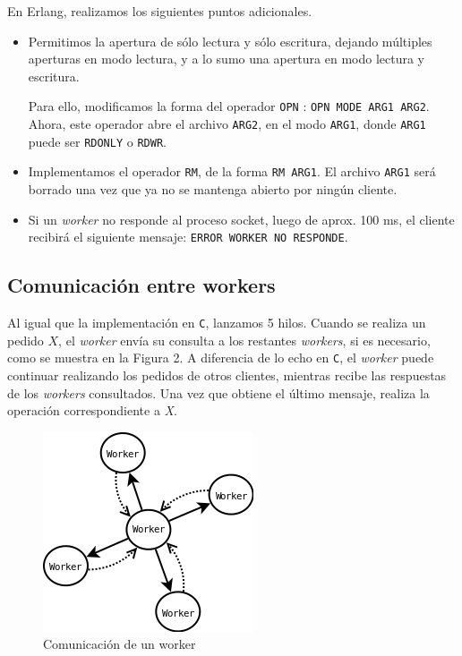 \documentclass[a4paper, 8pt]{article}
\begin{document}
En Erlang, realizamos los siguientes puntos adicionales.

\begin{itemize}
  \item Permitimos la apertura de sólo lectura y sólo escritura, dejando múltiples aperturas en modo lectura, y a lo sumo
  una apertura en modo lectura y escritura.
  
  Para ello, modificamos la forma del operador \texttt{OPN} :
  \texttt{OPN MODE ARG1 ARG2}. Ahora, este operador abre el archivo \texttt{ARG2}, en el modo \texttt{ARG1},
  donde \texttt{ARG1} puede ser \texttt{RDONLY} o \texttt{RDWR}.
  
  \item Implementamos el operador \texttt{RM}, de la forma
  \texttt{RM ARG1}. El archivo \texttt{ARG1} será borrado una vez que ya no se mantenga abierto por ningún cliente.
  
  \item Si un \textit{worker} no responde al proceso socket, luego de aprox. 100 ms, el cliente recibirá el siguiente mensaje: \texttt{ERROR WORKER NO RESPONDE}.
 
\end{itemize}

  \subsection{Comunicación entre workers}
  Al igual que la implementación en \texttt{C}, lanzamos 5 hilos. 
  Cuando se realiza un pedido $X$, el \textit{worker} envía su consulta a los restantes \textit{workers}, si es necesario, como se muestra en la Figura 2.
  A diferencia de lo echo en \texttt{C}, el \textit{worker} puede continuar realizando los pedidos de otros clientes, mientras recibe las
  respuestas de los \textit{workers} consultados.
  Una vez que obtiene el último mensaje, realiza la operación correspondiente a \textit{X}.
  
 \begin{figure}[htbp]
   \centering
     \includegraphics[scale=0.75]{dia2}
     \caption{Comunicación de un worker}
   \label{Figura 2}
 \end{figure}
  
\end{document}
